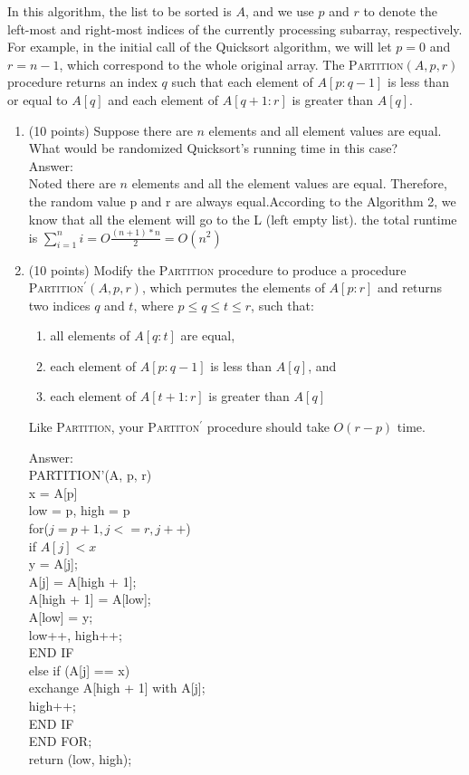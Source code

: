 \documentclass[12pt]{article}
\begin{document}
\begin{enumerate}
	In this algorithm, the list to be sorted is $A$, and we use $p$ and $r$ to denote the left-most and right-most indices of the currently processing subarray, respectively. For example, in the initial call of the Quicksort algorithm, we will let $p=0$ and $r=n-1$, which correspond to the whole original array. The \textsc{Partition}$(A,p,r)$ procedure returns an index $q$ such that each element of $A[p: q-1]$  is less than or equal to $A[q]$ and each element of $A[q+1:r]$ is greater than $A[q]$.
	
	\begin{enumerate}
		\item (10 points) Suppose there are $n$ elements and all element values are equal. What would be randomized Quicksort's running time in this case?
		 \\ {\color{blue}Answer:
		 \\Noted there are $n$ elements and all the element values are equal. Therefore, the random value p and r are always equal.According to the Algorithm 2, we know that all the element will go to the L (left empty list). the total runtime is $\sum_{i=1}^{n}i = O\frac{(n+1)*n}{2} = O(n^2)$
		 }
		\item (10 points) Modify the \textsc{Partition} procedure to produce a procedure \textsc{Partition}$^\prime(A,p,r)$, which permutes the elements of $A[p:r]$ and returns two indices $q$ and $t$, where $p\le q\le t\le r$, such that:
			\begin{enumerate}
				\item all elements of $A[q:t]$ are equal,
				\item each element of $A[p:q-1]$ is less than $A[q]$, and
				\item each element of $A[t+1:r]$ is greater than $A[q]$
			\end{enumerate}
		Like \textsc{Partition}, your \textsc{Partiton}$^\prime$ procedure should take $O(r-p)$ time.
		 \\ {\color{blue}Answer:
		 \\PARTITION'(A, p, r)
            \\x = A[p]
            \\low = p, high = p
    \\for($j = p + 1, j <= r, j++$)
        \\if $A[j] < x$
           \\  y = A[j];
           \\ A[j] = A[high + 1];
           \\ A[high + 1] = A[low];
           \\ A[low] = y;
           \\ low++, high++;
           \\END IF
        \\else if (A[j] == x)
            \\exchange A[high + 1] with A[j];
            \\high++;
            \\END IF
    \\END FOR;
    \\return (low, high);
    
}
\end{enumerate}
\end{enumerate}
\end{document}

